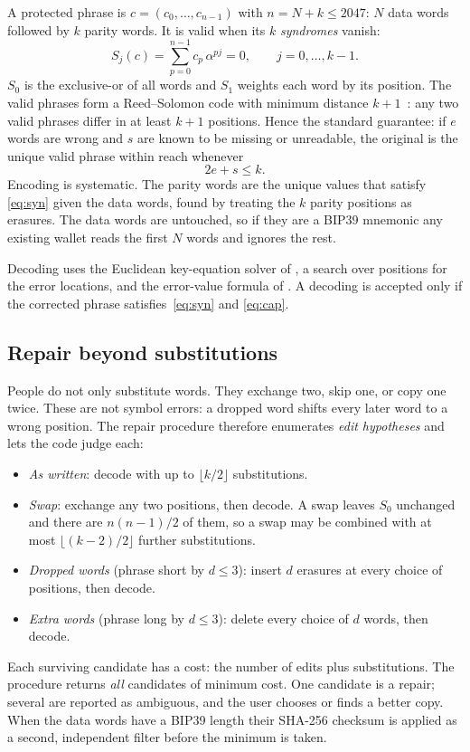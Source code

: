 \documentclass[numeric]{anvil-paper}
\begin{document}
A protected phrase is $c=(c_0,\dots,c_{n-1})$ with $n=N+k\le 2047$: $N$ data
words followed by $k$ parity words. It is valid when its $k$ \emph{syndromes}
vanish:
\begin{equation}
S_j(c)=\sum_{p=0}^{n-1} c_p\,\alpha^{pj}=0,\qquad j=0,\dots,k-1 .
\label{eq:syn}
\end{equation}
$S_0$ is the exclusive-or of all words and $S_1$ weights each word by its
position. The valid phrases form a Reed--Solomon code with minimum distance
$k+1$~\citep{reed1960polynomial}: any two valid phrases differ in at least $k+1$
positions. Hence the standard guarantee: if $e$ words are wrong and $s$ are
known to be missing or unreadable, the original is the unique valid phrase
within reach whenever
\begin{equation}
2e+s\le k .
\label{eq:cap}
\end{equation}
Encoding is systematic. The parity words are the unique values that satisfy
\eqref{eq:syn} given the data words, found by treating the $k$ parity positions
as erasures. The data words are untouched, so if they are a BIP39 mnemonic any
existing wallet reads the first $N$ words and ignores the rest.

Decoding uses the Euclidean key-equation solver of \citet{sugiyama1975method},
a search over positions for the error locations, and the error-value formula of
\citet{forney1965decoding}. A decoding is accepted only if the corrected phrase
satisfies~\eqref{eq:syn} and \eqref{eq:cap}.

\subsection{Repair beyond substitutions}

People do not only substitute words. They exchange two, skip one, or copy one
twice. These are not symbol errors: a dropped word shifts every later word to a
wrong position. The repair procedure therefore enumerates \emph{edit
hypotheses} and lets the code judge each:
\begin{itemize}
\item \emph{As written}: decode with up to $\lfloor k/2\rfloor$ substitutions.
\item \emph{Swap}: exchange any two positions, then decode. A swap leaves $S_0$
  unchanged and there are $n(n-1)/2$ of them, so a swap may be combined with
  at most $\lfloor (k-2)/2\rfloor$ further substitutions.
\item \emph{Dropped words} (phrase short by $d\le 3$): insert $d$ erasures at
  every choice of positions, then decode.
\item \emph{Extra words} (phrase long by $d\le 3$): delete every choice of $d$
  words, then decode.
\end{itemize}
Each surviving candidate has a cost: the number of edits plus substitutions.
The procedure returns \emph{all} candidates of minimum cost. One candidate is a
repair; several are reported as ambiguous, and the user chooses or finds a
better copy. When the data words have a BIP39 length their SHA-256 checksum is
applied as a second, independent filter before the minimum is taken.
\end{document}

